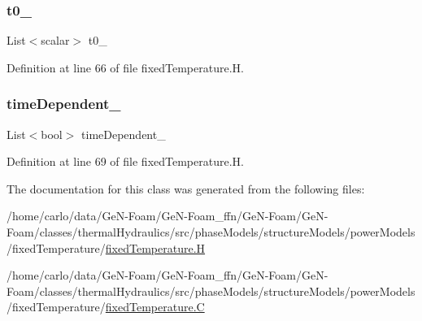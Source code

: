 \subsubsection{\texorpdfstring{t0\+\_\+}{t0\_}}
{\footnotesize\ttfamily List$<$scalar$>$ t0\+\_\+\hspace{0.3cm}{\ttfamily [protected]}}



Definition at line 66 of file fixed\+Temperature.\+H.

\mbox{\label{classFoam_1_1powerModels_1_1fixedTemperature_aa7de418f5709d721311e6d40486f54b2}} 
\subsubsection{\texorpdfstring{time\+Dependent\+\_\+}{timeDependent\_}}
{\footnotesize\ttfamily List$<$bool$>$ time\+Dependent\+\_\+\hspace{0.3cm}{\ttfamily [protected]}}



Definition at line 69 of file fixed\+Temperature.\+H.



The documentation for this class was generated from the following files\+:\begin{DoxyCompactItemize}
\item 
/home/carlo/data/\+Ge\+N-\/\+Foam/\+Ge\+N-\/\+Foam\+\_\+ffn/\+Ge\+N-\/\+Foam/\+Ge\+N-\/\+Foam/classes/thermal\+Hydraulics/src/phase\+Models/structure\+Models/power\+Models/fixed\+Temperature/\hyperlink{fixedTemperature_8H}{fixed\+Temperature.\+H}\item 
/home/carlo/data/\+Ge\+N-\/\+Foam/\+Ge\+N-\/\+Foam\+\_\+ffn/\+Ge\+N-\/\+Foam/\+Ge\+N-\/\+Foam/classes/thermal\+Hydraulics/src/phase\+Models/structure\+Models/power\+Models/fixed\+Temperature/\hyperlink{fixedTemperature_8C}{fixed\+Temperature.\+C}\end{DoxyCompactItemize}
